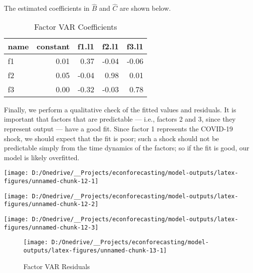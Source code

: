 \documentclass[11pt, letterpaper]{article}\usepackage[]{graphicx}\usepackage[]{color}
\begin{document}
The estimated coefficients in $\widehat{B}$ and $\widehat{C}$ are shown below.
\begin{table}[H]
\centering
\begingroup\footnotesize
\begin{tabular}{lrrrr}
  \hline
name & constant & f1.l1 & f2.l1 & f3.l1 \\ 
  \hline
f1 & 0.01 & 0.37 & -0.04 & -0.06 \\ 
  f2 & 0.05 & -0.04 & 0.98 & 0.01 \\ 
  f3 & 0.00 & -0.32 & -0.03 & 0.78 \\ 
   \hline
\end{tabular}
\endgroup
\caption{Factor VAR Coefficients} 
\end{table}



Finally, we perform a qualitative check of the fitted values and residuals. It is important that factors that are predictable --- i.e., factors 2 and 3, since they represent output --- have a good fit. Since factor 1 represents the COVID-19 shock, we should expect that the fit is poor; such a shock should not be predictable simply from the time dynamics of the factors; so if the fit is good, our model is likely overfitted.


{\centering \texttt{[image: D:/Onedrive/\_\_Projects/econforecasting/model-outputs/latex-figures/unnamed-chunk-12-1]} 

}




{\centering \texttt{[image: D:/Onedrive/\_\_Projects/econforecasting/model-outputs/latex-figures/unnamed-chunk-12-2]} 

}




{\centering \texttt{[image: D:/Onedrive/\_\_Projects/econforecasting/model-outputs/latex-figures/unnamed-chunk-12-3]} 

}





\begin{figure}[H]

{\centering \texttt{[image: D:/Onedrive/\_\_Projects/econforecasting/model-outputs/latex-figures/unnamed-chunk-13-1]} 

}

\caption[Factor VAR Residuals]{Factor VAR Residuals}\label{fig:unnamed-chunk-13}
\end{figure}
\end{document}
